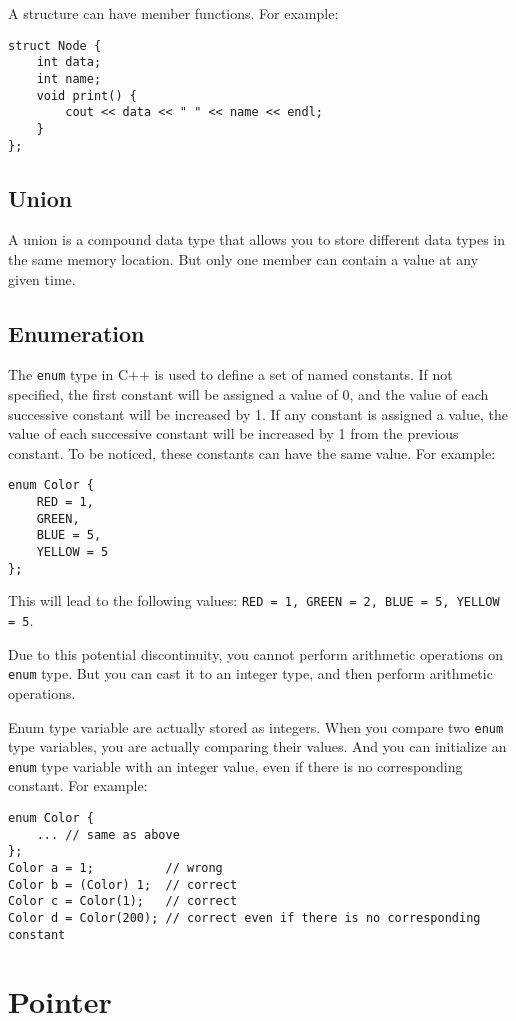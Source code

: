 \documentclass[a4paper,12pt]{article}
\begin{document}
A structure can have member functions.
For example:
\begin{verbatim}
struct Node {
    int data;
    int name;
    void print() {
        cout << data << " " << name << endl;
    }
};
\end{verbatim}

\subsection{Union}

A union is a compound data type that allows you to store different data types in the same memory location.
But only one member can contain a value at any given time.

\subsection{Enumeration}

The \texttt{enum} type in C++ is used to define a set of named constants.
If not specified, the first constant will be assigned a value of 0, and the value of each successive constant will be increased by 1.
If any constant is assigned a value, the value of each successive constant will be increased by 1 from the previous constant.
To be noticed, these constants can have the same value.
For example:
\begin{verbatim}
enum Color {
    RED = 1,
    GREEN,
    BLUE = 5,
    YELLOW = 5
};
\end{verbatim}

This will lead to the following values: \texttt{RED = 1, GREEN = 2, BLUE = 5, YELLOW = 5}.

Due to this potential discontinuity, you cannot perform arithmetic operations on \texttt{enum} type.
But you can cast it to an integer type, and then perform arithmetic operations.

Enum type variable are actually stored as integers.
When you compare two \texttt{enum} type variables, you are actually comparing their values.
And you can initialize an \texttt{enum} type variable with an integer value, even if there is no corresponding constant.
For example:
\begin{verbatim}
enum Color {
    ... // same as above
};
Color a = 1;          // wrong
Color b = (Color) 1;  // correct
Color c = Color(1);   // correct
Color d = Color(200); // correct even if there is no corresponding constant
\end{verbatim}

\section{Pointer}
\end{document}
